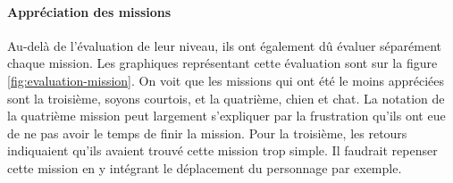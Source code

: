 \paragraph{Appréciation des missions}
\label{appreciation}
Au-delà de l'évaluation de leur niveau, ils ont également dû évaluer séparément chaque mission. Les graphiques représentant cette évaluation sont sur la figure \ref{fig:evaluation-mission}. On voit que les missions qui ont été le moins appréciées sont la troisième, soyons courtois, et la quatrième, chien et chat. La notation de la quatrième mission peut largement s'expliquer par la frustration qu'ils ont eue de ne pas avoir le temps de finir la mission. Pour la troisième, les retours indiquaient qu'ils avaient trouvé cette mission trop simple. Il faudrait repenser cette mission en y intégrant le déplacement du personnage par exemple.\\


